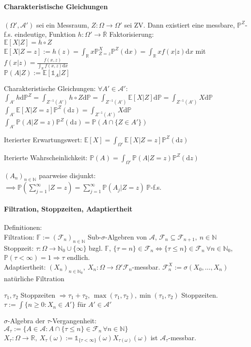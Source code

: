 \documentclass[a4paper,draft]{article}
\newcommand{\R}{\mathds{R}}
\newcommand{\N}{\mathds{N}}
\newcommand{\one}{\mathds{1}}
\newcommand{\A}{\mathcal{A}}
\renewcommand{\P}{\mathds{P}}
\newcommand{\E}[1]{\mathds{E}[#1]}
\newcommand{\F}{\mathcal{F}}
\newcommand{\cE}[2]{\E{#1 | #2}}
\renewcommand{\d}{\mathrm{d}}
\newcommand{\parh}{\par\hangindent=0.5cm}
\begin{document}
\begin{multicols}{2}
\paragraph{Charakteristische Gleichungen}\hspace{0pt}\parh
$(\Omega',\A')$ sei ein Messraum, $Z:\Omega\to\Omega'$ sei ZV. Dann existiert eine messbare, $\P^Z$-f.s. eindeutige, Funktion $h:\Omega'\to\overline{\R}$ Faktorisierung:\\
$\cE{X}{Z}=h\circ Z$\\
$\cE{X}{Z=z}:=h(z)=\int_\R x\P_{Z=z}^X \P^Z(\d x)=\int_\R xf(x|z)\d x$ mit $f(x|z)=\frac{f(x,z)}{\int_\R f(x,z)\d x}$\\
$\P(A|Z):=\cE{\one_A}{Z}$\parh
Charakteristische Gleichungen: $\forall A'\in\A'$:\\
$\int_{A'}h\d \P^Z=\int_{Z^{-1}(A')}h\circ Z \d\P=\int_{Z^{-1}(A')}\cE{X}{Z}\d\P=\int_{Z^{-1}(A')}X\d\P$\\
$\int_{A'}\cE{X}{Z=z}\P^Z(\d z)=\int_{Z^{-1}(A')}X\d\P$\\
$\int_{A'} \P(A|Z=z)\P^Z(\d z) =\P(A\cap\{Z\in A'\})$\parh
Iterierter Erwartungswert: $\E{X}=\int_{\Omega'}\cE{X}{Z=z}\P^Z(\d z)$\parh
Iterierte Wahrscheinlichkeit: $\P(A)=\int_{\Omega'}\P(A|Z=z)\P^Z(\d z)$\parh
$(A_n)_{n\in\N}$ paarweise disjunkt:\\
$\implies \P\left(\sum_{j=1}^\infty\big|Z=z\right)=\sum_{j=1}^\infty \P(A_j|Z=z) \: \P$-f.s.

\paragraph{Filtration, Stoppzeiten, Adaptiertheit}\hspace{0pt}\parh
Definitionen:\\
Filtration: $\mathds{F}:=(\F_n)_{n\in\N}$ Sub-$\sigma$-Algebren von $\A$, $\F_n\subseteq\F_{n+1},\:n\in\N$\\
Stoppzeit: $\tau:\Omega \to \N_0 \cup \{\infty\}$ bzgl. $\mathds{F}$, $\{\tau=n\}\in\F_n \Leftrightarrow\{\tau\leq n\}\in\F_n\:\forall n\in\N_0$, $\P(\tau<\infty)=1 \Rightarrow \tau$ endlich.\\
Adaptiertheit: $(X_n)_{n\in\N_0},\:X_n:\Omega\to\Omega' \F_n$-messbar. $\F_n^X:=\sigma(X_0,\dots,X_n)$ natürliche Filtration\parh
$\tau_1, \tau_2$ Stoppzeiten $\Longrightarrow \tau_1+\tau_2,\,\max(\tau_1,\tau_2),\min(\tau_1,\tau_2)$ Stoppzeiten. $\tau := \int\{n\geq0:X_n\in A'\}$ für $A'\in\A'$\parh
$\sigma$-Algebra der $\tau$-Vergangenheit:\\
$\A_\tau:=\{A\in\A:A\cap\{\tau\leq n\}\in\F_n\,\forall n\in\N\}$\\
$X_\tau :\Omega\to\R,\:X_\tau(\omega):=\one_{\{\tau<\infty\}}(\omega)X_{\tau(\omega)}(\omega)$ ist $\A_\tau$-messbar.


\end{multicols}
\end{document}
